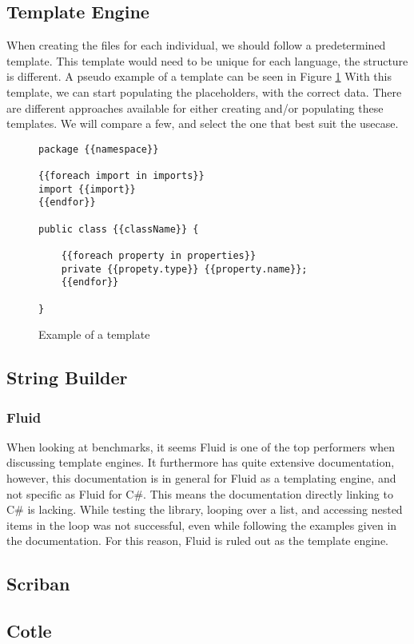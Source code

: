 \subsection{Template Engine}
When creating the files for each individual, we should follow a predetermined template. This template would need to be unique for each language, the structure is different. A pseudo example of a template can be seen in Figure \ref{code:template-example}
With this template, we can start populating the placeholders, with the correct data. There are different approaches available for either creating and/or populating these templates. We will compare a few, and select the one that best suit the usecase.

\begin{figure}
    \centering
\begin{lstlisting}[style=base]
package {{namespace}}

{{foreach import in imports}}
import {{import}}
{{endfor}}

public class {{className}} {

    {{foreach property in properties}}
    private {{propety.type}} {{property.name}};
    {{endfor}}
    
}
 \end{lstlisting}
    \caption{Example of a template}
    \label{code:template-example}
\end{figure}


\subsection{String Builder}


\subsubsection{Fluid}
When looking at benchmarks, it seems Fluid is one of the top performers when discussing template engines. It furthermore has quite extensive documentation, however, this documentation is in general for Fluid as a templating engine, and not specific as Fluid for C\#.
This means the documentation directly linking to C\# is lacking. While testing the library, looping over a list, and accessing nested items in the loop was not successful, even while following the examples given in the documentation.
For this reason, Fluid is ruled out as the template engine.

\subsection{Scriban}


\subsection{Cotle}

